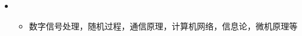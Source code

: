   \begin{itemize}[leftmargin=*]
    \item
      {\small
      \begin{itemize}
        \item{数字信号处理，随机过程，通信原理，计算机网络，信息论，微机原理等}
      \end{itemize}
      }
  \end{itemize}
